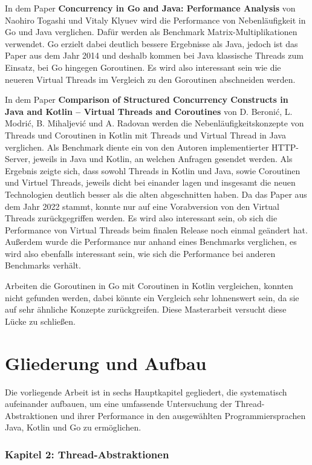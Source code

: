 \documentclass[fontsize=12pt,paper=a4,twoside=semi,parskip=half-,headsepline,headinclude]{scrreprt}
\begin{document}
In dem Paper \textbf{Concurrency in Go and Java: Performance Analysis} \cite{Togashi2014} von Naohiro Togashi und Vitaly Klyuev wird die Performance von Nebenläufigkeit in Go und Java verglichen. Dafür werden als Benchmark Matrix-Multiplikationen verwendet. Go erzielt dabei deutlich bessere Ergebnisse als Java, jedoch ist das Paper aus dem Jahr 2014 und deshalb kommen bei Java klassische Threads zum Einsatz, bei Go hingegen Goroutinen. Es wird also interessant sein wie die neueren Virtual Threads im Vergleich zu den Goroutinen abschneiden werden.

In dem Paper \textbf{Comparison of Structured Concurrency Constructs in Java and Kotlin – Virtual Threads and Coroutines} \cite{Modric2022} von D. Beronić, L. Modrić, B. Mihaljević und A. Radovan werden die Nebenläufigkeitskonzepte von Threads und Coroutinen in Kotlin mit Threads und Virtual Thread in Java verglichen. Als Benchmark diente ein von den Autoren implementierter HTTP-Server, jeweils in Java und Kotlin, an welchen Anfragen gesendet werden. Als Ergebnis zeigte sich, dass sowohl Threads in Kotlin und Java, sowie Coroutinen und Virtuel Threads, jeweils dicht bei einander lagen und insgesamt die neuen Technologien deutlich besser als die alten abgeschnitten haben. Da das Paper aus dem Jahr 2022 stammt, konnte nur auf eine Vorabversion von den Virtual Threads zurückgegriffen werden. Es wird also interessant sein, ob sich die Performance von Virtual Threads beim finalen Release noch einmal geändert hat. Außerdem wurde die Performance nur anhand eines Benchmarks verglichen, es wird also ebenfalls interessant sein, wie sich die Performance bei anderen Benchmarks verhält.

Arbeiten die Goroutinen in Go mit Coroutinen in Kotlin vergleichen, konnten nicht gefunden werden, dabei könnte ein Vergleich sehr lohnenswert sein, da sie auf sehr ähnliche Konzepte zurückgreifen. Diese Masterarbeit versucht diese Lücke zu schließen.

\section{Gliederung und Aufbau}

Die vorliegende Arbeit ist in sechs Hauptkapitel gegliedert, die systematisch aufeinander aufbauen, um eine umfassende Untersuchung der Thread-Abstraktionen und ihrer Performance in den ausgewählten Programmiersprachen Java, Kotlin und Go zu ermöglichen.

\subsubsection{Kapitel 2: Thread-Abstraktionen}
\end{document}

